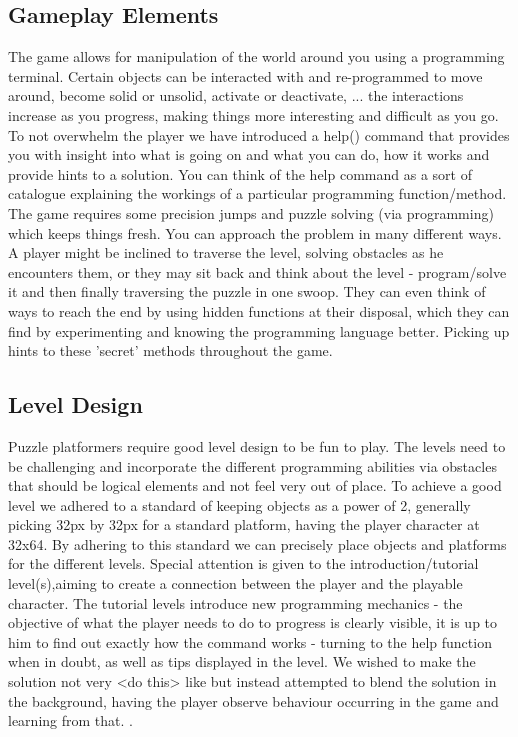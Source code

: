 \documentclass[a4paper,twoside,12pt]{article}
\begin{document}
\subsection{Gameplay Elements}
The game allows for manipulation of the world around you using a programming terminal. Certain objects can be interacted with and re-programmed to move around, become solid or unsolid, activate or deactivate, ...
the interactions increase as you progress, making things more interesting and difficult as you go. To not overwhelm the player we have introduced a help() command that provides you with insight into what is going on and what you can do, how it works and provide hints to a solution. You can think of the help command as a sort of catalogue explaining the workings of a particular programming function/method. The game requires some precision jumps and puzzle solving (via programming) which keeps things fresh. You can approach the problem in many different ways. A player might be inclined to traverse the level, solving obstacles as he encounters them, or they may sit back and think about the level - program/solve it and then finally traversing the puzzle in one swoop. They can even think of ways to reach the end by using hidden functions at their disposal, which they can find by experimenting and knowing the programming language better. Picking up hints to these 'secret' methods throughout the game.

\subsection{Level Design}

Puzzle platformers require good level design to be fun to play. The levels need to be challenging and incorporate the different programming abilities via obstacles that should be logical elements and not feel very out of place. To achieve a good level we adhered to a standard of keeping objects as a power of 2, generally picking 32px by 32px for a standard platform, having the player character at 32x64. By adhering to this standard we can precisely place objects and platforms for the different levels.
Special attention is given to the introduction/tutorial level(s),aiming to
create a connection between the player and the playable character. The
tutorial levels introduce new programming mechanics - the objective of what
the player needs to do to progress is clearly visible, it is up to him to find
out exactly how the command works - turning to the help function when in
doubt, as well as tips displayed in the level. We wished to make the solution
not very <do this> like but instead attempted to blend the solution in the
background, having the player observe behaviour occurring in the game and
learning from that.
.
\end{document}
